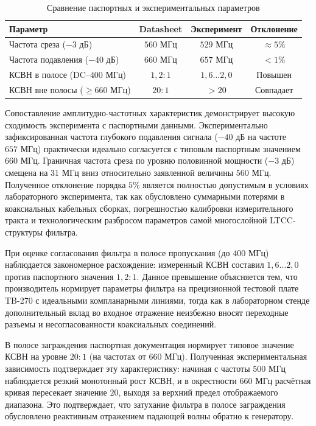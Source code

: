 \begin{table}[htbp]
    \caption{Сравнение паспортных и экспериментальных параметров}
    \vspace{0.2cm}
    \begin{tabularx}{\textwidth}{|X|c|c|c|}
        \hline
        \textbf{Параметр} & \textbf{Datasheet} & \textbf{Эксперимент} & \textbf{Отклонение} \\
        \hline
        Частота среза ($-3\text{ дБ}$) & $560\text{ МГц}$ & $529\text{ МГц}$ & $\approx 5\%$ \\
        \hline
        Частота подавления ($-40\text{ дБ}$) & $660\text{ МГц}$ & $657\text{ МГц}$ & $< 1\%$ \\
        \hline
        КСВН в полосе (DC--$400\text{ МГц}$) & $1{,}2 : 1$ & $1{,}6 \dots 2{,}0$ & Повышен \\
        \hline
        КСВН вне полосы ($\ge 660\text{ МГц}$) & $20 : 1$ & $> 20$ & Совпадает \\
        \hline
    \end{tabularx}
    \label{tab:datasheet_comparison}
\end{table}

\noindent 

Сопоставление амплитудно-частотных характеристик демонстрирует высокую сходимость эксперимента с паспортными данными. Экспериментально зафиксированная частота глубокого подавления сигнала ($-40\text{ дБ}$ на частоте $657\text{ МГц}$) практически идеально согласуется с типовым паспортным значением $660\text{ МГц}$. Граничная частота среза по уровню половинной мощности ($-3\text{ дБ}$) смещена на $31\text{ МГц}$ вниз относительно заявленной величины $560\text{ МГц}$. Полученное отклонение порядка $5\%$ является полностью допустимым в условиях лабораторного эксперимента, так как обусловлено суммарными потерями в коаксиальных кабельных сборках, погрешностью калибровки измерительного тракта и технологическим разбросом параметров самой многослойной LTCC-структуры фильтра.

При оценке согласования фильтра в полосе пропускания (до $400\text{ МГц}$) наблюдается закономерное расхождение: измеренный КСВН составил $1{,}6 \dots 2{,}0$ против паспортного значения $1{,}2 : 1$. Данное превышение объясняется тем, что производитель нормирует параметры фильтра на прецизионной тестовой плате TB-270 с идеальными компланарными линиями, тогда как в лабораторном стенде дополнительный вклад во входное отражение неизбежно вносят переходные разъемы и несогласованности коаксиальных соединений.

В полосе заграждения паспортная документация нормирует типовое значение КСВН на уровне $20 : 1$ (на частотах от $660$ МГц). Полученная экспериментальная зависимость подтверждает эту характеристику: начиная с частоты $500$ МГц наблюдается резкий монотонный рост КСВН, и в окрестности $660$ МГц расчётная кривая пересекает значение $20$, выходя за верхний предел отображаемого диапазона. Это подтверждает, что затухание фильтра в полосе заграждения обусловлено реактивным отражением падающей волны обратно к генератору.
